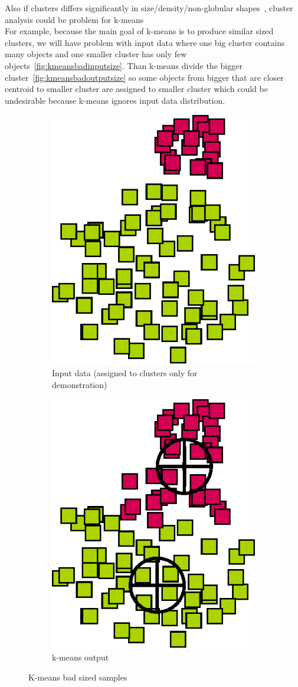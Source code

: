 Also if clusters differs significantly in size/density/non-globular shapes~\cite{Tan05}, cluster analysis could be problem for k-means\\
For example, because the main goal of k-means is to produce similar sized clusters, we will have problem with input data where one big cluster contains many objects and one smaller cluster has only few objects~\autoref{fig:kmeansbadinputsize}. Than k-means divide the bigger cluster~\autoref{fig:kmeansbadoutputsize} so some objects from bigger that are closer centroid to smaller cluster are assigned to smaller cluster which could be undesirable because k-means ignores input data distribution.
\begin{figure}[h]
\centering
\begin{subfigure}{.49\textwidth}
  \centering
  \includegraphics[width=.5\linewidth]{img/kmeans_badInputSampleSize.eps}
  \caption{Input data (assigned to clusters only for demonstration)}
  \label{fig:kmeansbadinputsize}
\end{subfigure}
\begin{subfigure}{.49\textwidth}
  \centering
  \includegraphics[width=.5\linewidth]{img/kmeans_badOutputSampleSize.eps}
  \caption{k-means output}
  \label{fig:kmeansbadoutputsize}
\end{subfigure}
\caption{K-means bad sized samples}
\end{figure}

